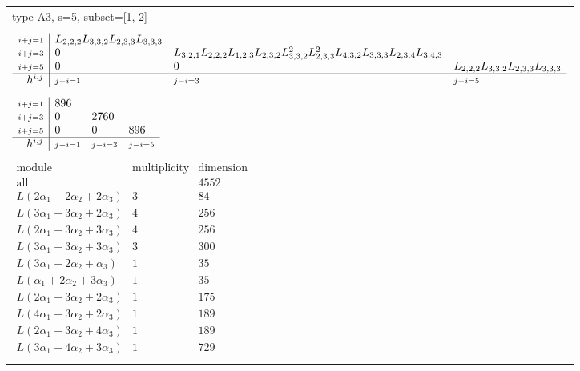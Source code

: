 \documentclass[crop,border=2mm]{standalone}
\begin{document}
\begin{tabular}{l}
{\huge type A3, s=5, subset=[1, 2]}\\ \\


$\displaystyle
\begin{array}{r|l l l}
	{\scriptstyle i+j=1}&L_{2,2,2}L_{3,3,2}L_{2,3,3}L_{3,3,3}&&\\
	{\scriptstyle i+j=3}&0&L_{3,2,1}L_{2,2,2}L_{1,2,3}L_{2,3,2}L_{3,3,2}^{2}L_{2,3,3}^{2}L_{4,3,2}L_{3,3,3}L_{2,3,4}L_{3,4,3}&\\
	{\scriptstyle i+j=5}&0&0&L_{2,2,2}L_{3,3,2}L_{2,3,3}L_{3,3,3}\\
	\hline h^{i,j}&{\scriptstyle j-i=1}&{\scriptstyle j-i=3}&{\scriptstyle j-i=5}
\end{array}
$ \\ \\


$\displaystyle
\begin{array}{r|l l l}
	{\scriptstyle i+j=1}&896&&\\
	{\scriptstyle i+j=3}&0&2760&\\
	{\scriptstyle i+j=5}&0&0&896\\
	\hline h^{i,j}&{\scriptstyle j-i=1}&{\scriptstyle j-i=3}&{\scriptstyle j-i=5}
\end{array}
$ \\ \\


$\displaystyle
\begin{array}{rll}
	\text{module}&\text{multiplicity}&\text{dimension} \\ \hline \text{all}&&4552 \\
	L\left( 2\alpha_{1}+ 2\alpha_{2}+ 2\alpha_{3}\right)&3&84\\
	L\left( 3\alpha_{1}+ 3\alpha_{2}+ 2\alpha_{3}\right)&4&256\\
	L\left( 2\alpha_{1}+ 3\alpha_{2}+ 3\alpha_{3}\right)&4&256\\
	L\left( 3\alpha_{1}+ 3\alpha_{2}+ 3\alpha_{3}\right)&3&300\\
	L\left( 3\alpha_{1}+ 2\alpha_{2}+\alpha_{3}\right)&1&35\\
	L\left(\alpha_{1}+ 2\alpha_{2}+ 3\alpha_{3}\right)&1&35\\
	L\left( 2\alpha_{1}+ 3\alpha_{2}+ 2\alpha_{3}\right)&1&175\\
	L\left( 4\alpha_{1}+ 3\alpha_{2}+ 2\alpha_{3}\right)&1&189\\
	L\left( 2\alpha_{1}+ 3\alpha_{2}+ 4\alpha_{3}\right)&1&189\\
	L\left( 3\alpha_{1}+ 4\alpha_{2}+ 3\alpha_{3}\right)&1&729
\end{array}
$ \\ \\

\end{tabular}
\end{document}
